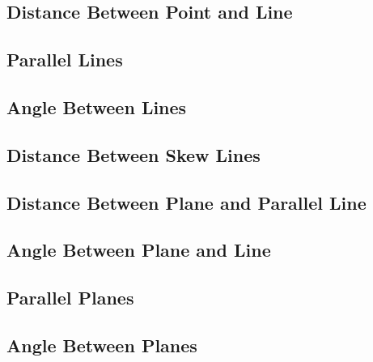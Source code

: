 \documentclass%
[handout]%
{beamer}
\begin{document}
{\subsection{Distance Between Point and Line}



\subsection{Parallel Lines}

\subsection{Angle Between Lines}

\subsection{Distance Between Skew Lines}

\subsection{Distance Between Plane and Parallel Line}

\subsection{Angle Between Plane and Line}


\subsection{Parallel Planes}

\subsection{Angle Between Planes}

} %
\end{document}

